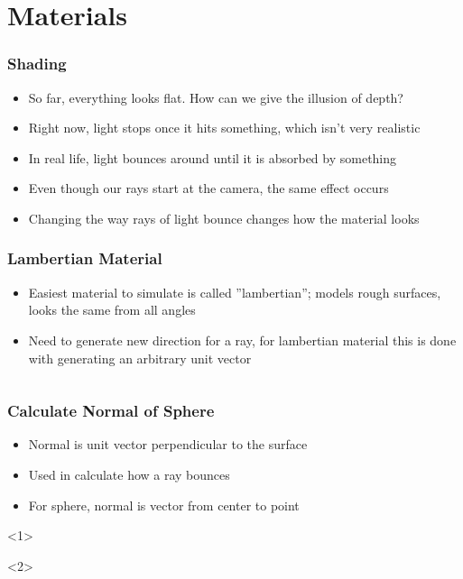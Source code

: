 \documentclass{beamer}
\begin{document}
\section{Materials}

\begin{frame}
	\frametitle{Shading}
	\begin{itemize}
		\item So far, everything looks flat. How can we give the illusion of depth?
		\item Right now, light stops once it hits something, which isn't very realistic
		\item In real life, light bounces around until it is absorbed by something
		\item Even though our rays start at the camera, the same effect occurs
		\item Changing the way rays of light bounce changes how the material looks
	\end{itemize}
\end{frame}

\begin{frame}[fragile]
	\frametitle{Lambertian Material}
	\begin{itemize}
		\item Easiest material to simulate is called ''lambertian''; models rough surfaces, looks the same from all angles
		\item Need to generate new direction for a ray, for lambertian material this is done with generating an arbitrary unit vector
	\end{itemize}
	\inputminted{python}{scripts/randSphere.py}
\end{frame}

\begin{frame}[fragile,t]
	\frametitle{Calculate Normal of Sphere}
	\begin{itemize}
		\item Normal is unit vector perpendicular to the surface
		\item Used in calculate how a ray bounces
		\item For sphere, normal is vector from center to point
	\end{itemize}
	\begin{onlyenv}
		\begin{center}
			\inputminted{python}{scripts/sphereNormal.py}
		\end{center}
	\end{onlyenv}
\end{frame}
\end{document}
